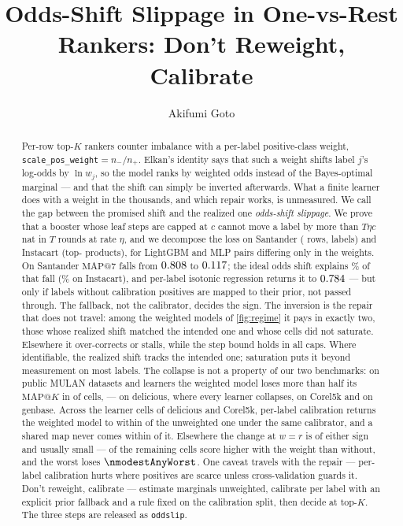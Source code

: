 \documentclass[sigconf,nonacm]{acmart}
\makeatletter
\newcommand{\mapk}{\mathrm{MAP}@K\xspace}
\newcommand{\mapseven}{\mathrm{MAP}@7\xspace}
\makeatother
\begin{document}
\title{Odds-Shift Slippage in One-vs-Rest Rankers: Don't Reweight, Calibrate}

\author{Akifumi Goto}

\begin{abstract}
Per-row top-$K$ rankers counter imbalance with a per-label positive-class weight, \texttt{scale\_pos\_weight}$=n_-/n_+$. Elkan's identity says that such a weight shifts label $j$'s log-odds by $\ln w_j$, so the model ranks by weighted odds instead of the Bayes-optimal marginal --- and that the shift can simply be inverted afterwards. What a finite learner does with a weight in the thousands, and which repair works, is unmeasured.
We call the gap between the promised shift and the realized one \emph{odds-shift slippage}. We prove that a booster whose leaf steps are capped at $c$ cannot move a label by more than $T\eta c$ nat in $T$ rounds at rate $\eta$, and we decompose the loss on Santander (\nnTest{} rows, \nnLabels{} labels) and Instacart (top-\nInLabels{} products), for LightGBM and MLP pairs differing only in the weights. On Santander $\mapseven$ falls from $0.808$ to $0.117$; the ideal odds shift explains \noddsShare\% of that fall (\nIoddsShare\% on Instacart), and per-label isotonic regression returns it to $0.784$ --- but only if labels without calibration positives are mapped to their prior, not passed through. The fallback, not the calibrator, decides the sign.
The inversion is the repair that does not travel: among the weighted models of \cref{fig:regime} it pays in exactly two, those whose realized shift matched the intended one and whose cells did not saturate. Elsewhere it over-corrects or stalls, while the step bound holds in all \ncapN{} caps. Where identifiable, the realized shift tracks the intended one; saturation puts it beyond measurement on most labels. The collapse is not a property of our two benchmarks: on \nnMulan{} public MULAN datasets and \nnLearners{} learners the weighted model loses more than half its $\mapk$ in \nnCollapseCells{} of \nnDoseCells{} cells, --- \nnDelCollapseLearners{} on delicious, where every learner collapses, \nnCorelCollapseLearners{} on Corel5k and \nnOtherCollapseCells{} on genbase. Across the \nnRepairCollapseCells{} learner cells of delicious and Corel5k, per-label calibration returns the weighted model to within \nmaxRepairGapCollapse{} of the unweighted one under the same calibrator, and a shared map never comes within \nminPooledGapCollapse{} of it. Elsewhere the change at $w{=}r$ is of either sign and usually small --- \nnDoseGain{} of the remaining cells score higher with the weight than without, and the worst loses $\nmodestAnyWorst$. One caveat travels with the repair --- per-label calibration hurts where positives are scarce unless cross-validation guards it. Don't reweight, calibrate --- estimate marginals unweighted, calibrate per label with an explicit prior fallback and a rule fixed on the calibration split, then decide at top-$K$. The three steps are released as \texttt{oddslip}.
\end{abstract}
\end{document}
